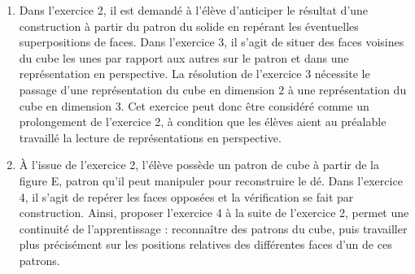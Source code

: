 \begin{corrige}
\begin{enumerate}
   {\bf Concernant la consigne :}
   \begin{itemize}
      \item le statut des objets : dans l'exercice 1, on parle d'assemblages de carrés, alors que dans l'exercice 2 on parle de figures ;
      \item la formulation : dans l'exercice 1, la question est fermée, il s'agit de trouver les deux seuls patrons de cube. Dans l'exercice 2, le nombre de solutions n'est pas indiqué ;
      \item la réponse attendue : dans l'exercice 1, les élèves doivent reproduire deux assemblages, alors que dans l'exercice 2, ils doivent reproduire sur papier quadrillé les figures permettant de construire le cube et vérifier en essayant de le construire effectivement.
   \end{itemize}
   {\bf Concernant la vérification :}
   \begin{itemize}
      \item dans l'exercice 1 aucune vérification n'est évoquée ;
      \item à contrario, dans l'exercice 2, l'élève doit vérifier ses propositions par reconstruction du cube à partir des patrons. La reproduction de ces patrons est facilitée par l'utilisation du papier quadrillé.
   \end{itemize}
   \item Dans l'exercice 2, il est demandé à l'élève d'anticiper le résultat d'une construction à partir du patron du solide en repérant les éventuelles superpositions de faces. Dans l'exercice 3, il s'agit de situer des faces voisines du cube les unes par rapport aux autres sur le patron et dans une représentation en perspective. La résolution de l'exercice 3 nécessite le passage d'une représentation du cube en dimension 2 à une représentation du cube en dimension 3. Cet exercice peut donc être considéré comme un prolongement de l'exercice 2, à condition que les élèves aient au préalable travaillé la lecture de représentations en perspective.
   \item À l'issue de l'exercice 2, l'élève possède un patron de cube à partir de la figure E, patron qu'il peut manipuler pour reconstruire le dé. Dans l'exercice 4, il s'agit de repérer les faces opposées et la vérification se fait par construction. Ainsi, proposer l'exercice 4 à la suite de l'exercice 2, permet une continuité de l'apprentissage : reconnaître des patrons du cube, puis travailler plus précisément sur les positions relatives des différentes faces d'un de ces patrons.
\end{enumerate}
\end{corrige}

